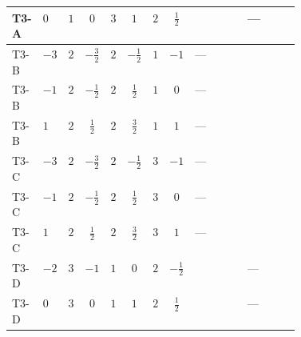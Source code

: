 \documentclass[8pt]{article}
\begin{document}
\begin{landscape}
\begin{longtable}{@{}llcccccc >{\raggedright\arraybackslash}p{0.21\linewidth} >{\raggedright\arraybackslash}p{0.21\linewidth}@{}}
\midrule
T3-A & $0$ & $1$ & $0$ & $3$ & $1$ & $2$ & $\frac{1}{2}$ & \scriptsize\adjustbox{max width=\linewidth}{$\begin{gathered} -\frac{{g_2}^3}{2}\end{gathered}$} & --- \\
\midrule
T3-B & $-3$ & $2$ & $-\frac{3}{2}$ & $2$ & $-\frac{1}{2}$ & $1$ & $-1$ & --- & \scriptsize\adjustbox{max width=\linewidth}{$\begin{gathered} -\frac{17 {g_2}^3}{6}\end{gathered}$} \\
\midrule
T3-B & $-1$ & $2$ & $-\frac{1}{2}$ & $2$ & $\frac{1}{2}$ & $1$ & $0$ & --- & \scriptsize\adjustbox{max width=\linewidth}{$\begin{gathered} -\frac{17 {g_2}^3}{6}\end{gathered}$} \\
\midrule
T3-B & $1$ & $2$ & $\frac{1}{2}$ & $2$ & $\frac{3}{2}$ & $1$ & $1$ & --- & \scriptsize\adjustbox{max width=\linewidth}{$\begin{gathered} -\frac{17 {g_2}^3}{6}\end{gathered}$} \\
\midrule
T3-C & $-3$ & $2$ & $-\frac{3}{2}$ & $2$ & $-\frac{1}{2}$ & $3$ & $-1$ & --- & \scriptsize\adjustbox{max width=\linewidth}{$\begin{gathered} \frac{31 {g_2}^3}{6}\end{gathered}$} \\
\midrule
T3-C & $-1$ & $2$ & $-\frac{1}{2}$ & $2$ & $\frac{1}{2}$ & $3$ & $0$ & --- & \scriptsize\adjustbox{max width=\linewidth}{$\begin{gathered} \frac{7 {g_2}^3}{6}\end{gathered}$} \\
\midrule
T3-C & $1$ & $2$ & $\frac{1}{2}$ & $2$ & $\frac{3}{2}$ & $3$ & $1$ & --- & \scriptsize\adjustbox{max width=\linewidth}{$\begin{gathered} \frac{31 {g_2}^3}{6}\end{gathered}$} \\
\midrule
T3-D & $-2$ & $3$ & $-1$ & $1$ & $0$ & $2$ & $-\frac{1}{2}$ & \scriptsize\adjustbox{max width=\linewidth}{$\begin{gathered} -\frac{{g_2}^3}{2}\end{gathered}$} & --- \\
\midrule
T3-D & $0$ & $3$ & $0$ & $1$ & $1$ & $2$ & $\frac{1}{2}$ & \scriptsize\adjustbox{max width=\linewidth}{$\begin{gathered} -\frac{{g_2}^3}{2}\end{gathered}$} & --- \\

\end{longtable}
\end{landscape}
\end{document}

